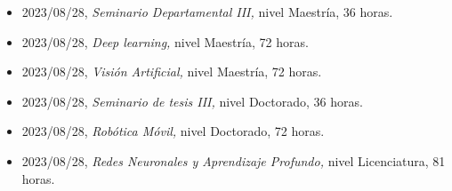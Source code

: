 \begin{itemize}
\item 2023/08/28, \textit{ Seminario Departamental III,} nivel Maestría, 36 horas. 
\item 2023/08/28, \textit{ Deep learning,} nivel Maestría, 72 horas. 
\item 2023/08/28, \textit{ Visión Artificial,} nivel Maestría, 72 horas. 
\item 2023/08/28, \textit{ Seminario de tesis III,} nivel Doctorado, 36 horas. 
\item 2023/08/28, \textit{ Robótica Móvil,} nivel Doctorado, 72 horas. 
\item 2023/08/28, \textit{ Redes Neuronales y Aprendizaje Profundo,} nivel Licenciatura, 81 horas. 
\end{itemize} 
